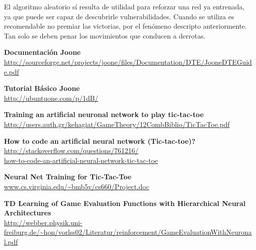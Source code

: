 \documentclass[12pt,titlepage]{article}
\begin{document}
El algoritmo aleatorio s\'i resulta de utilidad para reforzar una red ya entrenada, ya que puede ser capaz de descubrirle vulnerabilidades. Cuando se utiliza es recomendable no premiar las victorias, por el fen\'omeno descripto anteriormente. Tan solo se deben penar los movimientos que conducen a derrotas. \\




\pagebreak
\begin{thebibliography}{99}
		\textbf{Documentaci\'on Joone} \\
		\url{http://sourceforge.net/projects/joone/files/Documentation/DTE/JooneDTEGuide.pdf}

		\textbf{Tutorial B\'asico Joone} \\
		\url{http://ubuntuone.com/p/1dB/}

		\textbf{Training an artificial neuronal network to play tic-tac-toe} \\
		\url{http://users.auth.gr/kehagiat/GameTheory/12CombBiblio/TicTacToe.pdf}

		\textbf{How to code an artificial neural network (Tic-tac-toe)?} \\
		\url{http://stackoverflow.com/questions/761216/} \\
		\url{how-to-code-an-artificial-neural-network-tic-tac-toe}

		\textbf{Neural Net Training for Tic-Tac-Toe} \\
		\url{www.cs.virginia.edu/~bmb5v/cs660/Project.doc}

		\textbf{TD Learning of Game Evaluation Functions with Hierarchical Neural Architectures} \\
		\url{http://webber.physik.uni-freiburg.de/~hon/vorlss02/Literatur/reinforcement/GameEvaluationWithNeuronal.pdf}

\end{thebibliography}


\end{document}
